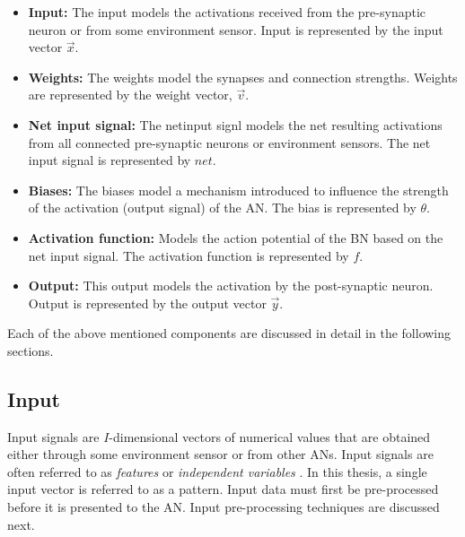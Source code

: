 \begin{itemize}
    \item
    \textbf{Input:} The input models the activations received from the pre-synaptic neuron
    or from some environment sensor. Input is represented by the input vector
    $\vec{x}$.

    \item
    \textbf{Weights:} The weights model the synapses and connection
    strengths. Weights are represented by the weight vector, $\vec{v}$.

    \item
    \textbf{Net input signal:} The netinput signl models
    the net resulting activations from all connected pre-synaptic neurons or
    environment sensors. The net input signal is
    represented by $net$.

    \item
    \textbf{Biases:} The biases model a mechanism introduced to influence the strength of the
    activation (output signal) of the \ac{AN}. The bias is
    represented by $\theta$.

    \item
    \textbf{Activation function:} Models the action potential of the
    \ac{BN} based on the net input signal. The activation function is
    represented by $f$.

    \item
    \textbf{Output:} This output models the activation by the post-synaptic neuron. Output is
    represented by the output vector $\vec{y}$.
\end{itemize}

Each of the above mentioned components are discussed in detail in the following
sections.


\subsection{Input}
\label{sec:anns:an:input}

Input signals are $I$-dimensional vectors of numerical values that are obtained
either through some environment sensor or from other \acp{AN}. Input signals
are often referred to as \textit{features} or \textit{independent variables} \cite{ref:francis:2001}. In this
thesis, a single input vector is referred to as a pattern. Input data must first
be pre-processed before it is presented to the \ac{AN}. Input pre-processing
techniques are discussed next.


